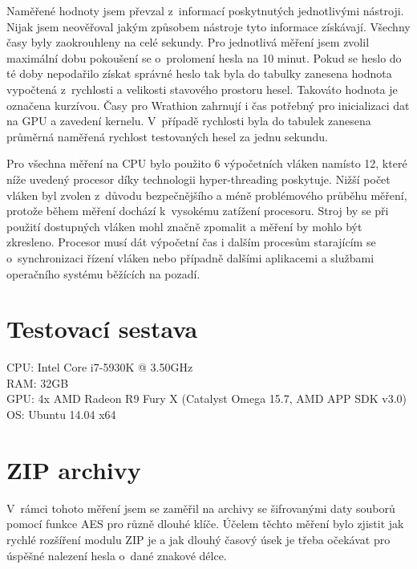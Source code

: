 Naměřené hodnoty jsem převzal z~informací poskytnutých jednotlivými nástroji. Nijak jsem
neověřoval jakým způsobem nástroje tyto informace získávají. Všechny časy byly zaokrouhleny na
celé sekundy. Pro jednotlivá měření jsem zvolil maximální dobu pokoušení se o~prolomení hesla na
10 minut. Pokud se heslo do té doby nepodařilo získat správné heslo tak byla do tabulky zanesena
hodnota vypočtená z~rychlosti a velikosti stavového prostoru hesel. Takováto hodnota je označena
kurzívou. Časy pro Wrathion zahrnují i čas potřebný pro inicializaci dat na GPU a zavedení
kernelu. V~případě rychlosti byla do tabulek zanesena průměrná naměřená rychlost testovaných
hesel za jednu sekundu.

Pro všechna měření na CPU bylo použito 6 výpočetních vláken namísto 12, které níže uvedený
procesor díky technologii hyper-threading poskytuje. Nižší počet vláken byl zvolen z~důvodu
bezpečnějšího a méně problémového průběhu měření, protože během měření dochází k~vysokému zatížení
procesoru. Stroj by se při použití dostupných vláken mohl značně zpomalit a měření by mohlo být
zkresleno. Procesor musí dát výpočetní čas i dalším procesům starajícím se o~synchronizaci řízení
vláken nebo případně dalšími aplikacemi a službami operačního systému běžících na pozadí.  

\section{Testovací sestava}
CPU: Intel Core i7-5930K @ 3.50GHz\\
RAM: 32GB\\
GPU: 4x AMD Radeon R9 Fury X (Catalyst Omega 15.7, AMD APP SDK v3.0)\\
OS: Ubuntu 14.04 x64
\section{ZIP archivy}
V~rámci tohoto měření jsem se zaměřil na archivy se šifrovanými daty souborů pomocí funkce AES
pro různě dlouhé klíče. Účelem těchto měření bylo zjistit jak rychlé rozšíření modulu ZIP je a
jak dlouhý časový úsek je třeba očekávat pro úspěšné nalezení hesla o~dané znakové délce. 

